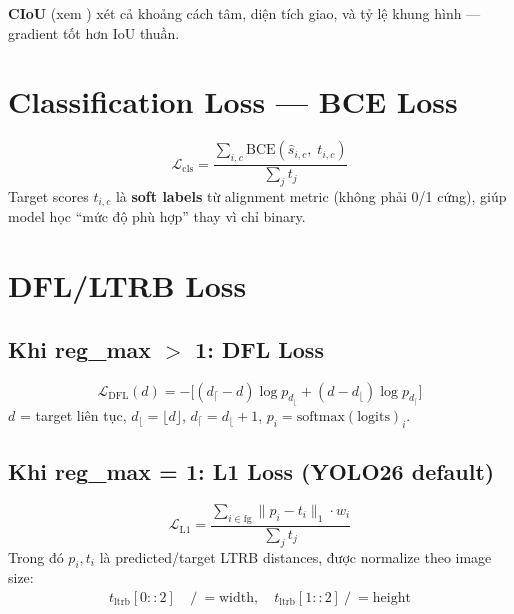 \textbf{CIoU} (xem ) xét cả khoảng cách tâm, diện tích giao, và tỷ lệ khung hình --- gradient tốt hơn IoU thuần.

\section{Classification Loss --- BCE Loss}

\begin{equation}
    \mathcal{L}_{\text{cls}} = \frac{\sum_{i,c} \text{BCE}(\hat{s}_{i,c}, \; t_{i,c})}{\sum_j t_j}
\end{equation}
Target scores $t_{i,c}$ là \textbf{soft labels} từ alignment metric (không phải 0/1 cứng), giúp model học ``mức độ phù hợp'' thay vì chỉ binary.

\section{DFL/LTRB Loss}
\label{sec:dfl_loss}

\subsection{Khi reg\_max $>$ 1: DFL Loss}

\begin{equation}
    \mathcal{L}_{\text{DFL}}(d) = -\Big[(d_{\lceil} - d) \log p_{d_{\lfloor}} + (d - d_{\lfloor}) \log p_{d_{\lceil}}\Big]
\end{equation}
$d$ = target liên tục, $d_{\lfloor} = \lfloor d \rfloor$, $d_{\lceil} = d_{\lfloor} + 1$, $p_i = \text{softmax}(\text{logits})_i$.

\subsection{Khi reg\_max = 1: L1 Loss (YOLO26 default)}

\begin{equation}
    \mathcal{L}_{\text{L1}} = \frac{\sum_{i \in \text{fg}} \|p_i - t_i\|_1 \cdot w_i}{\sum_j t_j}
\end{equation}
Trong đó $p_i, t_i$ là predicted/target LTRB distances, được normalize theo image size:
\begin{align}
    t_{\text{ltrb}}[0::2] &\mathrel{/}= \text{width}, \quad t_{\text{ltrb}}[1::2] \mathrel{/}= \text{height}
\end{align}

